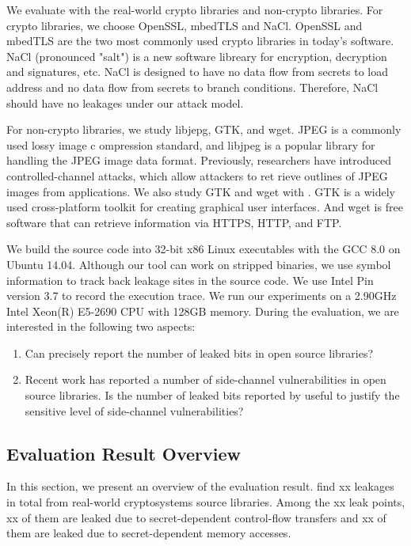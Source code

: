 We evaluate \tool{} with the real-world crypto libraries and non-crypto libraries. 
For crypto libraries, we choose OpenSSL, mbedTLS and NaCl. 
OpenSSL and mbedTLS are the two most commonly used
crypto libraries in today's software. NaCl (pronounced "salt") is a 
new software libreary for encryption, decryption and signatures, etc.
NaCl is designed to have no data flow from secrets to load address and no data 
flow from secrets to branch conditions. Therefore, NaCl should have no leakages
under our attack model. 

For non-crypto libraries, we study libjepg, GTK, and wget.
JPEG is a commonly used lossy image c ompression standard, and
libjpeg is a popular library for handling the JPEG image data
format. Previously, researchers have introduced controlled-channel
attacks, which allow attackers to ret rieve outlines of JPEG images
from applications. We also study GTK and wget with \tool{}. GTK 
is a widely used cross-platform toolkit for creating graphical user
interfaces. And wget is free software that can retrieve information
via HTTPS, HTTP, and FTP.

We build the source code into 32-bit x86 Linux executables with the 
GCC 8.0 on Ubuntu 14.04. Although our tool can
work on stripped binaries, we use symbol information to track
back leakage sites in the source code. We use Intel Pin version 3.7 
to record the execution trace. We run our experiments on a 2.90GHz
Intel Xeon(R) E5-2690 CPU with 128GB memory.
During the evaluation, we are interested in the following two
aspects:
\begin{enumerate}
    
    \item  Can \tool{} precisely
    report the number of leaked bits in open source libraries?
    \item  Recent work has reported a number
    of side-channel vulnerabilities in open source libraries. 
    Is the number of leaked bits reported by \tool{} useful to justify 
    the sensitive level of side-channel vulnerabilities?
   
\end{enumerate}

\subsection{Evaluation Result Overview}
In this section, we present an overview of the evaluation result. 
\tool{} find xx leakages in total from real-world cryptosystems source libraries.
 Among the xx leak points, xx of them are leaked due
to secret-dependent control-flow transfers and xx of them are leaked 
due to secret-dependent memory accesses. 

